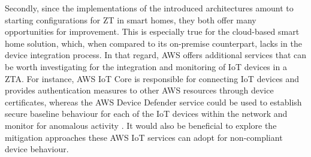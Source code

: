 Secondly, since the implementations of the introduced architectures amount to starting configurations for ZT in smart homes, they both offer many opportunities for improvement. This is especially true for the cloud-based smart home solution, which, when compared to its on-premise counterpart, lacks in the device integration process. In that regard, AWS offers additional services that can be worth investigating for the integration and monitoring of IoT devices in a ZTA. For instance, AWS IoT Core is responsible for connecting IoT devices and provides authentication measures to other AWS resources through device certificates, whereas the AWS Device Defender service could be used to establish secure baseline behaviour for each of the IoT devices within the network and monitor for anomalous activity \cite{aws_iot_zt}. It would also be beneficial to explore the mitigation approaches these AWS IoT services can adopt for non-compliant device behaviour.

